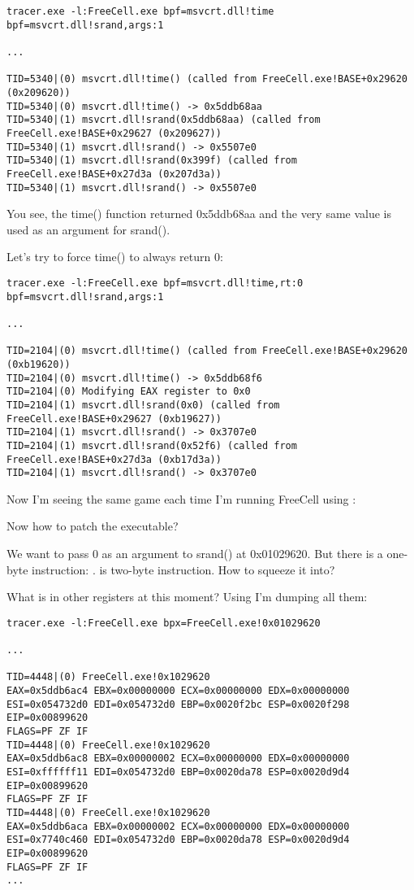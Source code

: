 \begin{lstlisting}
tracer.exe -l:FreeCell.exe bpf=msvcrt.dll!time bpf=msvcrt.dll!srand,args:1

...

TID=5340|(0) msvcrt.dll!time() (called from FreeCell.exe!BASE+0x29620 (0x209620))
TID=5340|(0) msvcrt.dll!time() -> 0x5ddb68aa
TID=5340|(1) msvcrt.dll!srand(0x5ddb68aa) (called from FreeCell.exe!BASE+0x29627 (0x209627))
TID=5340|(1) msvcrt.dll!srand() -> 0x5507e0
TID=5340|(1) msvcrt.dll!srand(0x399f) (called from FreeCell.exe!BASE+0x27d3a (0x207d3a))
TID=5340|(1) msvcrt.dll!srand() -> 0x5507e0
\end{lstlisting}

You see, the time() function returned 0x5ddb68aa and the very same value is used as an argument for srand().

Let's try to force time() to always return 0:

\begin{lstlisting}
tracer.exe -l:FreeCell.exe bpf=msvcrt.dll!time,rt:0 bpf=msvcrt.dll!srand,args:1

...

TID=2104|(0) msvcrt.dll!time() (called from FreeCell.exe!BASE+0x29620 (0xb19620))
TID=2104|(0) msvcrt.dll!time() -> 0x5ddb68f6
TID=2104|(0) Modifying EAX register to 0x0
TID=2104|(1) msvcrt.dll!srand(0x0) (called from FreeCell.exe!BASE+0x29627 (0xb19627))
TID=2104|(1) msvcrt.dll!srand() -> 0x3707e0
TID=2104|(1) msvcrt.dll!srand(0x52f6) (called from FreeCell.exe!BASE+0x27d3a (0xb17d3a))
TID=2104|(1) msvcrt.dll!srand() -> 0x3707e0
\end{lstlisting}

Now I'm seeing the same game each time I'm running FreeCell using \tracer:

\begin{figure}[H]
\centering
{}
\end{figure}

Now how to patch the executable?

We want to pass 0 as an argument to srand() at 0x01029620.
But there is a one-byte instruction: .
 is two-byte instruction. How to squeeze it into?

What is in other registers at this moment? Using \tracer I'm dumping all them:

\begin{lstlisting}
tracer.exe -l:FreeCell.exe bpx=FreeCell.exe!0x01029620

...

TID=4448|(0) FreeCell.exe!0x1029620
EAX=0x5ddb6ac4 EBX=0x00000000 ECX=0x00000000 EDX=0x00000000
ESI=0x054732d0 EDI=0x054732d0 EBP=0x0020f2bc ESP=0x0020f298
EIP=0x00899620
FLAGS=PF ZF IF
TID=4448|(0) FreeCell.exe!0x1029620
EAX=0x5ddb6ac8 EBX=0x00000002 ECX=0x00000000 EDX=0x00000000
ESI=0xffffff11 EDI=0x054732d0 EBP=0x0020da78 ESP=0x0020d9d4
EIP=0x00899620
FLAGS=PF ZF IF
TID=4448|(0) FreeCell.exe!0x1029620
EAX=0x5ddb6aca EBX=0x00000002 ECX=0x00000000 EDX=0x00000000
ESI=0x7740c460 EDI=0x054732d0 EBP=0x0020da78 ESP=0x0020d9d4
EIP=0x00899620
FLAGS=PF ZF IF
...
\end{lstlisting}

